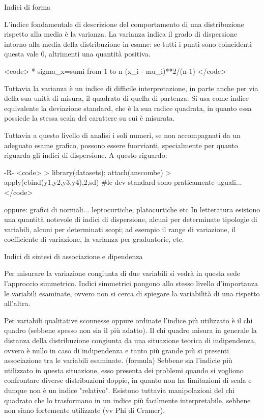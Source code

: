 \documentclass{book}
\begin{document}
Indici di forma

L'indice fondamentale di descrizione del comportamento di una distribuzione rispetto alla media è la varianza.
La varianza indica il grado di dispersione intorno alla media della distribuzione in esame: se tutti i punti sono coincidenti questa vale 0, altrimenti una quantità positiva.

<code>
 *	sigma_x=sum{i from 1 to n} (x_i - mu_i)**2/(n-1)
</code>

Tuttavia la varianza è un indice di difficile interpretazione, in parte anche per via della sua unità di misura, il quadrato di quella di partenza. Si usa come indice equivalente la deviazione standard, che è la sua radice quadrata, in quanto essa possiede la stessa scala del carattere su cui è misurata.

Tuttavia a questo livello di analisi i soli numeri, se non accompagnati da un adeguato esame grafico, possono essere fuorvianti, specialmente per quanto riguarda gli indici di dispersione. A questo riguardo:

	-R-
<code>
> library(datasets); attach(anscombe)
> apply(cbind(y1,y2,y3,y4),2,sd)
#le dev standard sono praticamente uguali...
</code>

oppure:
grafici di normali... leptocurtiche, platocurtiche etc
In letteratura esistono una quantità notevole di indici di dispersione, alcuni per determinate tipologie di variabili, alcuni per determinati scopi; ad esempio il range di variazione, il coefficiente di variazione, la varianza per graduatorie, etc.

Indici di sintesi di associazione e dipendenza

Per misurare la variazione congiunta di due variabili si vedrà in questa sede l'approccio simmetrico.
Indici simmetrici pongono allo stesso livello d'importanza le variabili esaminate, ovvero non si cerca di spiegare la variabilità di una rispetto all'altra.

Per variabili qualitative sconnesse oppure ordinate l'indice più utilizzato è il chi quadro (sebbene spesso non sia il più adatto). Il chi quadro misura in generale la distanza della distribuzione congiunta da una situazione teorica di indipendenza, ovvero è nullo in caso di indipendenza e tanto più grande più si presenti associazione tra le variabili esaminate.
(formula)
Sebbene sia l'indicie più utilizzato in questa situazione, esso presenta dei problemi quando si vogliono confrontare diverse distribuzioni doppie, in quanto non ha limitazioni di scala e dunque non è un indice "relativo". Esistono tuttavia manipolazioni del chi quadrato che lo trasformano in un indice più facilmente interpretabile, sebbene non siano fortemente utilizzate (vv Phi di Cramer).
\end{document}
